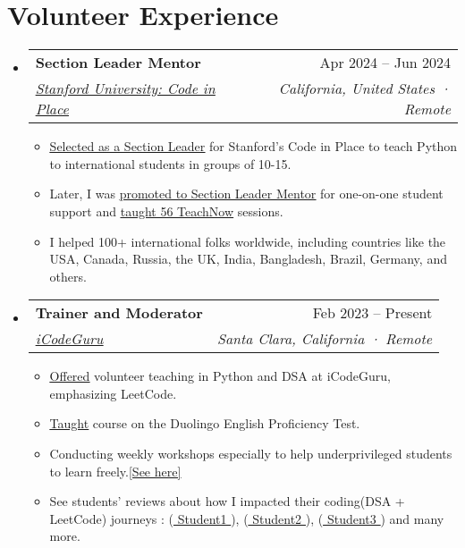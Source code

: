 \documentclass[letterpaper,11pt]{article}
\makeatletter
\newcommand{\resumeItem}[1]{
  \item\small{
    {#1 \vspace{-2pt}}
  }
}
\newcommand{\resumeSubheading}[4]{
  \vspace{-2pt}\item
    \begin{tabular*}{0.97\textwidth}[t]{l@{\extracolsep{\fill}}r}
      \textbf{#1} & #2 \\
      \textit{\small#3} & \textit{\small #4} \\
    \end{tabular*}\vspace{-7pt}
}
\newcommand{\resumeSubHeadingListStart}{\begin{itemize}[leftmargin=0.15in, label={}]}
\newcommand{\resumeSubHeadingListEnd}{\end{itemize}}
\newcommand{\resumeItemListStart}{\begin{itemize}}
\newcommand{\resumeItemListEnd}{\end{itemize}\vspace{-5pt}}
\makeatother
\begin{document}
\section{\textbf{Volunteer Experience}}
\resumeSubHeadingListStart
\resumeSubheading
{Section Leader Mentor}{Apr 2024 -- Jun 2024}
{{\href{https://codeinplace.stanford.edu/}{\underline{Stanford University: Code in Place}}}}{California, United States · Remote}
\resumeItemListStart
\resumeItem{{\href{https://www.linkedin.com/feed/update/urn:li:activity:7186385467846639620/}{\underline{Selected as a Section Leader}}} for Stanford's Code in Place to teach Python to international students in groups of 10-15.}
\resumeItem{Later, I was {\href{https://www.linkedin.com/posts/ahmad-jajja_stanfordabrcodeabrinabrplaceabrlearnings-activity-7195142429073633281-zNhV?utm_source=share&utm_medium=member_desktop}{\underline{promoted to Section Leader Mentor}}} for one-on-one student support and {\href{https://www.linkedin.com/feed/update/urn:li:activity:7204425552311541760/}{\underline{taught 56 TeachNow}}} sessions.}
\resumeItem{ I helped 100+ international folks worldwide, including countries like the USA, Canada, Russia, the UK, India, Bangladesh, Brazil, Germany, and others.}
\resumeItemListEnd
\resumeSubheading
{Trainer and Moderator}{Feb 2023 -- Present}
{{\href{https://www.linkedin.com/company/icode-guru/mycompany/}{\underline{iCodeGuru}}}}{Santa Clara, California · Remote}
\resumeItemListStart
\resumeItem{{\href{https://github.com/Ahmadjajja/LeetCode_Volunteer_Teaching}{\underline{Offered}}} volunteer teaching in Python and DSA at iCodeGuru, emphasizing LeetCode.}
\resumeItem{{\href{https://www.linkedin.com/feed/update/urn:li:activity:7169346246216671232/}{\underline{Taught}}} course on the Duolingo English Proficiency Test.}
\resumeItem{Conducting weekly workshops especially to help underprivileged students to learn freely.{\href{https://github.com/Ahmadjajja/LeetCode_Volunteer_Teaching}{\underline{[See here]}}}}
\resumeItem{See students' reviews about how I impacted their coding(DSA + LeetCode) journeys : ({\href{https://www.linkedin.com/posts/sikander-nawaz_dsa-dsa-leetcode-activity-7170805639886106624-Kxka?utm_source=share&utm_medium=member_desktop}{\underline{ Student1 }}}), ({\href{https://www.linkedin.com/posts/syedshahzilimran_mastering-trees-unlocking-the-key-of-dsa-activity-7174974045019398144-DN_C?utm_source=share&utm_medium=member_desktop}{\underline{ Student2 }}}), ({\href{https://www.linkedin.com/feed/update/urn:li:activity:7173635314391920640/}{\underline{ Student3 }}}) and many more. }
\resumeItemListEnd
\resumeSubHeadingListEnd
%
\end{document}

